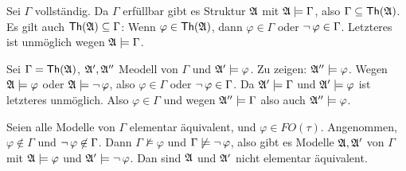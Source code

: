 \begin{description}[style=nextline]
  \item[(1)$\IMPL$(2)]
  Sei $\Gamma$ vollständig. Da $\Gamma$ erfüllbar gibt es Struktur $\mathfrak{A}$ mit $\mathfrak{A}\models\Gamma$,
  also $\Gamma\subseteq\operatorname{\text{\textsf{Th}}}(\mathfrak{A})$. Es gilt auch $\operatorname{\text{\textsf{Th}}}(\mathfrak{A})\subseteq\Gamma$:
  Wenn $\varphi\in\operatorname{\text{\textsf{Th}}}(\mathfrak{A})$, dann $\varphi\in\Gamma$ oder $\operatorname{\neg}\varphi\in\Gamma$.
  Letzteres ist unmöglich wegen $\mathfrak{A}\models\Gamma$.
  
  \item[(2)$\IMPL$(3)]
  Sei $\Gamma=\operatorname{\text{\textsf{Th}}}(\mathfrak{A})$, $\mathfrak{A}', \mathfrak{A}''$ Meodell von $\Gamma$ und $\mathfrak{A}'\models\varphi$.
  Zu zeigen: $\mathfrak{A}''\models\varphi$. Wegen $\mathfrak{A}\models\varphi$ oder $\mathfrak{A}\models\operatorname{\neg}\varphi$,
  also $\varphi\in\Gamma$ oder $\operatorname{\neg}\varphi\in\Gamma$. Da $\mathfrak{A}'\models\Gamma$ und $\mathfrak{A}'\models\varphi$
  ist letzteres unmöglich. Also $\varphi\in\Gamma$ und wegen $\mathfrak{A}''\models\Gamma$ also auch $\mathfrak{A}''\models\varphi$.
  
  \item[(3)$\IMPL$(1)]
  Seien alle Modelle von $\Gamma$ elementar äquivalent, und $\varphi\in FO(\tau)$. Angenommen,
  $\varphi\not\in\Gamma$ und $\operatorname{\neg}\varphi\not\in\Gamma$. Dann $\Gamma\not\models\varphi$ und
  $\Gamma\not\models\operatorname{\neg}\varphi$, also gibt es Modelle $\mathfrak{A}, \mathfrak{A}'$ von $\Gamma$ mit
  $\mathfrak{A}\models\varphi$ und $\mathfrak{A}'\models\operatorname{\neg}\varphi$. Dan sind $\mathfrak{A}$ und $\mathfrak{A}'$ nicht elementar
  äquivalent.
\end{description}

\subsection{}


